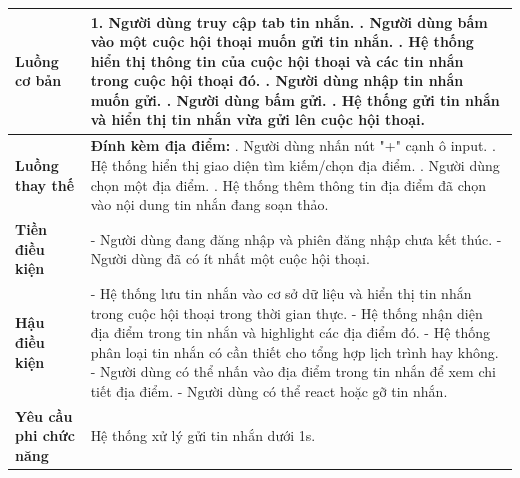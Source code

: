 \begin{longtable}{| p{4cm} | p{\dimexpr\linewidth-4cm-4\tabcolsep} |}
    \textbf{Luồng cơ bản} & 1. Người dùng truy cập tab tin nhắn. \newline
                           2. Người dùng bấm vào một cuộc hội thoại muốn gửi tin nhắn. \newline
                           3. Hệ thống hiển thị thông tin của cuộc hội thoại và các tin nhắn trong cuộc hội thoại đó. \newline
                           4. Người dùng nhập tin nhắn muốn gửi. \newline
                           5. Người dùng bấm gửi. \newline
                           6. Hệ thống gửi tin nhắn và hiển thị tin nhắn vừa gửi lên cuộc hội thoại. \\
    \hline
    \textbf{Luồng thay thế} & \textbf{Đính kèm địa điểm:} \newline
                               1. Người dùng nhấn nút "+" cạnh ô input. \newline
                               2. Hệ thống hiển thị giao diện tìm kiếm/chọn địa điểm. \newline
                               3. Người dùng chọn một địa điểm. \newline
                               4. Hệ thống thêm thông tin địa điểm đã chọn vào nội dung tin nhắn đang soạn thảo. \\
    \hline
    \textbf{Tiền điều kiện} & - Người dùng đang đăng nhập và phiên đăng nhập chưa kết thúc. \newline
                           - Người dùng đã có ít nhất một cuộc hội thoại. \\
    \hline
    \textbf{Hậu điều kiện} & - Hệ thống lưu tin nhắn vào cơ sở dữ liệu và hiển thị tin nhắn trong cuộc hội thoại trong thời gian thực. \newline
                           - Hệ thống nhận diện địa điểm trong tin nhắn và highlight các địa điểm đó. \newline
                           - Hệ thống phân loại tin nhắn có cần thiết cho tổng hợp lịch trình hay không. \newline
                           - Người dùng có thể nhấn vào địa điểm trong tin nhắn để xem chi tiết địa điểm. \newline
                           - Người dùng có thể react hoặc gỡ tin nhắn. \\
    \hline
    \textbf{Yêu cầu phi chức năng} & Hệ thống xử lý gửi tin nhắn dưới 1s. \\

\end{longtable}
\vspace{0.8cm}

